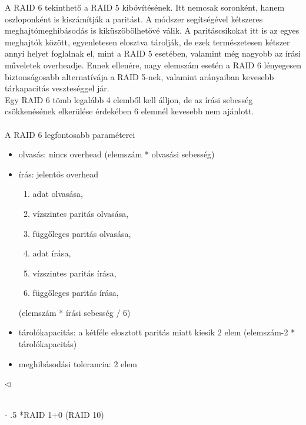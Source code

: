 \documentclass[tikz,12pt,margin=0px]{article}
\makeatletter
\renewcommand\paragraph{%
	\@startsection{paragraph}{4}{0mm}%
	{-\baselineskip}%
	{.5\baselineskip}%
	{\normalfont\normalsize\bfseries}}
\makeatother
\begin{document}
    {\footnotesize \noindent {\color{blue} \faLightbulbO\ $\triangleright$ } }
    {\footnotesize
    \noindent A RAID 6 tekinthető a RAID 5 kibővítésének. Itt nemcsak soronként, hanem oszloponként is kiszámítják a paritást. A módszer segítségével kétszeres meghajtómeghibásodás is kiküszöbölhetővé válik. A paritáscsíkokat itt is az egyes meghajtók között, egyenletesen elosztva tárolják, de ezek természetesen kétszer annyi helyet foglalnak el, mint a RAID 5 esetében, valamint még nagyobb az írási műveletek overheadje. Ennek ellenére, nagy elemszám esetén a RAID 6 lényegesen biztonságosabb alternatívája a RAID 5-nek, valamint arányaiban kevesebb tárkapacitás veszteséggel jár.\\

    \noindent Egy RAID 6 tömb legalább 4 elemből kell álljon, de az írási sebesség csökkenésének elkerülése érdekében 6 elemnél kevesebb nem ajánlott.\\\\

    \noindent A RAID 6 legfontosabb paraméterei
    \begin{itemize}[topsep=8pt,itemsep=4pt,partopsep=4pt, parsep=4pt]
        \item olvasás: nincs overhead (elemszám * olvasási sebesség)
        \item írás: jelentős overhead
        \begin{enumerate}
            \item adat olvasása,
            \item vízszintes paritás olvasása,
            \item függőleges paritás olvasása,
            \item adat írása,
            \item vízszintes paritás írása,
            \item függőleges paritás írása,
        \end{enumerate}
        (elemszám * írási sebesség / 6)
        \item tárolókapacitás: a kétféle elosztott paritás miatt kiesik 2 elem (elemszám-2 * tárolókapacitás)
        \item meghibásodási tolerancia: 2 elem
    \end{itemize}
    $\triangleleft$ \faLightbulbO}\\

	\paragraph*{RAID 1+0 (RAID 10)}
\end{document}
